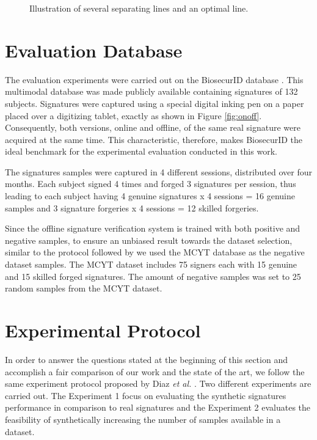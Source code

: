 \begin{figure*}[!htb]
\centering
\hspace*{0.5in} %

\caption{Illustration of several separating lines and an optimal line.} \label{fig:svm}
\end{figure*}


\section{Evaluation Database}

The evaluation experiments were carried out on the BiosecurID database \cite{biosecurid}. This multimodal database was made publicly available containing signatures of 132 subjects. Signatures were captured using a special digital inking pen on a paper placed over a digitizing tablet, exactly as shown in Figure \ref{fig:onoff}. Consequently, both versions, online and offline, of the same real signature were acquired at the same time. This characteristic, therefore, makes BiosecurID the ideal benchmark for the experimental evaluation conducted in this work.


The signatures samples were captured in 4 different sessions, distributed over four months. Each subject signed 4 times and forged 3 signatures per session, thus leading to each subject having 4 genuine signatures x 4 sessions = 16 genuine samples and 3 signature forgeries x 4 sessions = 12 skilled forgeries.

Since the offline signature verification system is trained with both positive and negative samples, to ensure an unbiased result towards the dataset selection, similar to the protocol followed by \cite{diaz2014generation} we used the MCYT database \cite{mcyt-100} as the negative dataset samples. The MCYT dataset includes 75 signers each with 15 genuine and 15 skilled forged signatures. The amount of negative samples was set to 25 random samples from the MCYT dataset.



\section{Experimental Protocol}
In order to answer the questions stated at the beginning of this section and accomplish a fair comparison of our work and the state of the art, we follow the same experiment protocol proposed by Diaz \textit{et al.} \cite{diaz2014generation}. Two different experiments are carried out. The Experiment 1 focus on evaluating the synthetic signatures performance in comparison to real signatures and the Experiment 2 evaluates the feasibility of synthetically increasing the number of samples available in a dataset. 

